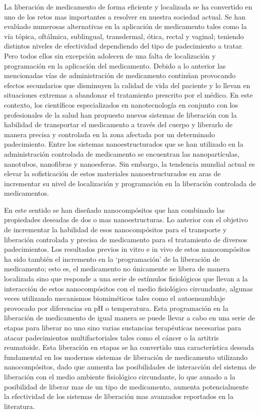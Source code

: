 \documentclass[a4paper,fleqn]{cas-sc}
\begin{document}
La liberación de medicamento de forma eficiente y localizada se ha convertido en uno de los retos mas importantes a resolver en nuestra sociedad actual. Se han evalúado numerosas alternativas en la aplicación de medicamento tales como la vía tópica, oftálmica, sublingual, transdermal, ótica, rectal y vaginal; teniendo distintos niveles de efectividad dependiendo del tipo de padecimiento a tratar. Pero todos ellos sin excepción adolecen de una falta de localización y programación en la aplicación del medicamento. Debido a lo anterior las mencionadas vías de administración de medicamento continúan provocando efectos secundarios que disminuyen la calidad de vida del paciente y lo llevan en situaciones extremas a abandonar el tratamiento prescrito por el médico. En este contexto, los científicos especializados en nanotecnología en conjunto con los profesionales de la salud han propuesto nuevos sistemas de liberación con la habilidad de transportar el medicamento a través del cuerpo y liberarlo de manera precisa y controlada en la zona afectada por un determinado padecimiento. Entre los sistemas nanoestructurados que se han utilizado en la administración controlada de medicamento se encuentran las nanopartículas, nanotubos, nanofibras y nanoesferas. Sin embargo, la tendencia mundial actual es elevar la sofisticación de estos materiales nanoestructurados en aras de incrementar su nivel de localización y programación en la liberación controlada de medicamentos.

En este sentido se han diseñado nanocompósitos que han combinado las propiedades deseadas de dos o mas nanoestructuras. Lo anterior con el objetivo de incrementar la habilidad de esos nanocompósitos para el transporte y liberación controlada y precisa de medicamento para el tratamiento de diversos padecimientos. Los resultados previos in vitro e in vivo de estos nanocompósitos ha sido también el incremento en la ‘programación’ de la liberación de medicamento; esto es, el medicamento no únicamente se libera de manera localizada sino que responde a una serie de estímulos fisiológicos que llevan a la interacción de estos nanocompósitos con el medio fisiológico circundante, algunas veces utilizando mecanismos biomiméticos tales como el autoensamblaje provocado por diferencias en pH o temperatura. Esta programación en la liberación de medicamento de igual manera se puede llevar a cabo en una serie de etapas para liberar no uno sino varias sustancias terapéuticas necesarias para atacar padecimientos multifactoriales tales como el cáncer o la artitris reumatoide. Esta liberación en etapas se ha convertido una característica deseada fundamental en los modernos sistemas de liberación de medicamento utilizando nanocompósitos, dado que aumenta las posibilidades de interacción del sistema de liberación con el medio ambiente fisiológico circundante, lo que aunado a la posibilidad de liberar mas de un tipo de medicamento, aumenta potencialmente la efectividad de los sistemas de liberación mas avanzados reportados en la literatura.
\end{document}
